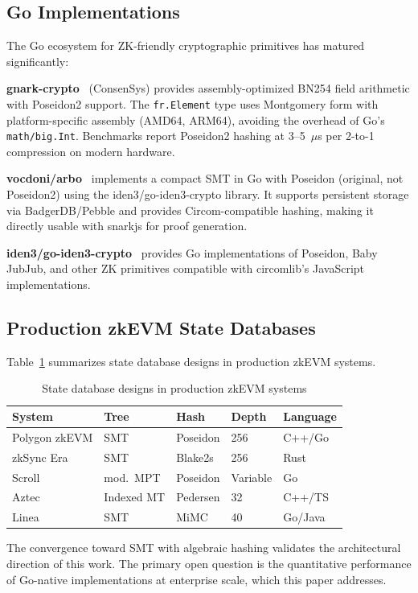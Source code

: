 \subsection{Go Implementations}

The Go ecosystem for ZK-friendly cryptographic primitives has matured
significantly:

\textbf{gnark-crypto}~\cite{gnark2024crypto} (ConsenSys) provides
assembly-optimized BN254 field arithmetic with Poseidon2 support.
The \texttt{fr.Element} type uses Montgomery form with platform-specific
assembly (AMD64, ARM64), avoiding the overhead of Go's
\texttt{math/big.Int}. Benchmarks report Poseidon2 hashing at
3--5~$\mu$s per 2-to-1 compression on modern hardware.

\textbf{vocdoni/arbo}~\cite{vocdoni2024arbo} implements a compact
SMT in Go with Poseidon (original, not Poseidon2) using the
iden3/go-iden3-crypto library. It supports persistent storage via
BadgerDB/Pebble and provides Circom-compatible hashing, making it
directly usable with snarkjs for proof generation.

\textbf{iden3/go-iden3-crypto}~\cite{iden3gocrypto} provides
Go implementations of Poseidon, Baby JubJub, and other
ZK primitives compatible with circomlib's JavaScript
implementations.

\subsection{Production zkEVM State Databases}

Table~\ref{tab:production-systems} summarizes state database
designs in production zkEVM systems.

\begin{table}[h]
\centering
\caption{State database designs in production zkEVM systems}
\label{tab:production-systems}
\begin{tabular}{lllll}
\toprule
\textbf{System} & \textbf{Tree} & \textbf{Hash} & \textbf{Depth} & \textbf{Language} \\
\midrule
Polygon zkEVM & SMT & Poseidon & 256 & C++/Go \\
zkSync Era & SMT & Blake2s & 256 & Rust \\
Scroll & mod.\ MPT & Poseidon & Variable & Go \\
Aztec & Indexed MT & Pedersen & 32 & C++/TS \\
Linea & SMT & MiMC & 40 & Go/Java \\
\bottomrule
\end{tabular}
\end{table}

The convergence toward SMT with algebraic hashing validates the
architectural direction of this work. The primary open question
is the quantitative performance of Go-native implementations at
enterprise scale, which this paper addresses.

